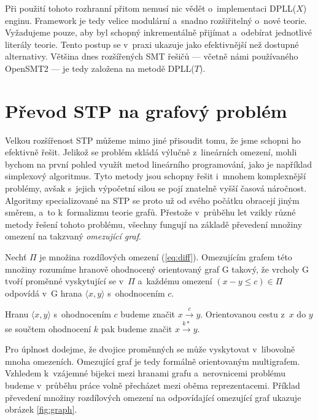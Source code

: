 Při použití tohoto rozhranní přitom \Solver nemusí nic vědět o~implementaci DPLL($X$) enginu. Framework je tedy velice modulární a~snadno rozšiřitelný o~nové teorie. Vyžadujeme pouze, aby byl \Solver schopný inkrementálně přijímat a~odebírat jednotlivé literály teorie. Tento postup se v~praxi ukazuje jako efektivnější než dostupné alternativy. Většina dnes rozšířených SMT řešičů --- včetně námi používaného OpenSMT2 --- je tedy založena na metodě DPLL($T$).

\section{Převod STP na grafový problém}\label{graf}

Velkou rozšířenost STP můžeme mimo jiné přisoudit tomu, že jsme schopni ho efektivně řešit. Jelikož se problém skládá výlučně z~lineárních omezení, mohli bychom na první pohled využít metod lineárního programování, jako je například simplexový algoritmus. Tyto metody jsou schopny řešit i~mnohem komplexnější problémy, avšak s~jejich výpočetní silou se pojí znatelně vyšší časová náročnost. Algoritmy specializované na STP se proto už od svého počátku \cite[Kapitola 2]{Dechter91} obracejí jiným směrem, a~to k~formalizmu teorie grafů. Přestože v~průběhu let vzikly různé metody řešení tohoto problému, všechny fungují na základě převedení množiny omezení na takzvaný \emph{omezující graf}.

\begin{definice}
	Nechť $\Pi$ je množina rozdílových omezení (\ref{eq:diff}). Omezujícím grafem této množiny rozumíme hranově ohodnocený orientovaný graf G takový, že vrcholy G tvoří proměnné vyskytující se v~$\Pi$ a~každému omezení $(x-y \leq c) \in \Pi$ odpovídá v~G hrana $\langle x,y\rangle$ s~ohodnocením $c$.
\end{definice}
\begin{pozn}
	Hranu $\langle x,y\rangle$ s~ohodnocením $c$ budeme značit $x \xrightarrow{c} y$. Orientovanou cestu z~$x$ do $y$ se součtem ohodnocení $k$ pak budeme značit $x \xrightarrow{k*} y$.
\end{pozn}

Pro úplnost dodejme, že dvojice proměnných se může vyskytovat v~libovolně mnoha omezeních. Omezující graf je tedy formálně orientovaným multigrafem. Vzhledem k~vzájemné bijekci mezi hranami grafu a~nerovnicemi problému budeme v~průběhu práce volně přecházet mezi oběma reprezentacemi. Příklad převedení množiny rozdílových omezení na odpovídající omezující graf ukazuje obrázek \ref{fig:graph}.

